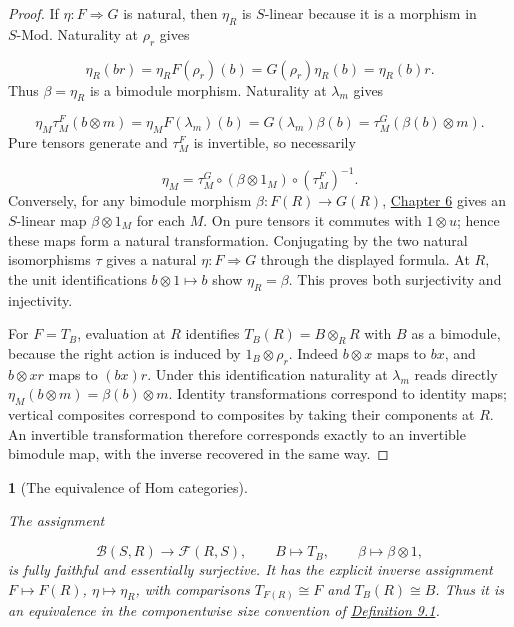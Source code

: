 \documentclass[11pt,a4paper]{article}
\newcommand{\mathheading}{}
\theoremstyle{plain}
\newtheorem*{plainstatement}{\mathheading}
\theoremstyle{definition}
\newenvironment{mathstatement}[3]{\renewcommand{\mathheading}{#1 #2}\begin{plainstatement}[#3]}{\end{plainstatement}}
\begin{document}
\begin{proof}

If \(\eta:F\Rightarrow G\) is natural, then \(\eta_R\) is \(S\)-linear because it is a morphism in \(S\text{-Mod}\). Naturality at \(\rho_r\) gives

 \[\eta_R(br)=\eta_RF(\rho_r)(b)=G(\rho_r)\eta_R(b)=\eta_R(b)r.\] 
Thus \(\beta=\eta_R\) is a bimodule morphism. Naturality at \(\lambda_m\) gives

 \[\eta_M\tau^F_M(b\otimes m)=\eta_MF(\lambda_m)(b)=G(\lambda_m)\beta(b)=\tau^G_M(\beta(b)\otimes m).\] 
Pure tensors generate and \(\tau^F_M\) is invertible, so necessarily

 \[\eta_M=\tau^G_M\circ(\beta\otimes1_M)\circ(\tau^F_M)^{-1}.\] 
Conversely, for any bimodule morphism \(\beta:F(R)\to G(R)\), \hyperref[chapter-06]{Chapter 6} gives an \(S\)-linear map \(\beta\otimes1_M\) for each \(M\). On pure tensors it commutes with \(1\otimes u\); hence these maps form a natural transformation. Conjugating by the two natural isomorphisms \(\tau\) gives a natural \(\eta:F\Rightarrow G\) through the displayed formula. At \(R\), the unit identifications \(b\otimes1\mapsto b\) show \(\eta_R=\beta\). This proves both surjectivity and injectivity.

 
For \(F=T_B\), evaluation at \(R\) identifies \(T_B(R)=B\otimes_RR\) with \(B\) as a bimodule, because the right action is induced by \(1_B\otimes\rho_r\). Indeed \(b\otimes x\) maps to \(bx\), and \(b\otimes xr\) maps to \((bx)r\). Under this identification naturality at \(\lambda_m\) reads directly \(\eta_M(b\otimes m)=\beta(b)\otimes m\). Identity transformations correspond to identity maps; vertical composites correspond to composites by taking their components at \(R\). An invertible transformation therefore corresponds exactly to an invertible bimodule map, with the inverse recovered in the same way.


\end{proof}
 
\begin{mathstatement}{Corollary}{9.6}{The equivalence of Hom categories}
\label{env-9-6}

The assignment

 \[\mathscr B(S,R)\longrightarrow\mathscr F(R,S),\qquad B\longmapsto T_B,\qquad \beta\longmapsto\beta\otimes1,\] 
is fully faithful and essentially surjective. It has the explicit inverse assignment \(F\mapsto F(R)\), \(\eta\mapsto\eta_R\), with comparisons \(T_{F(R)}\cong F\) and \(T_B(R)\cong B\). Thus it is an equivalence in the componentwise size convention of \hyperref[env-9-1]{Definition 9.1}.


\par{}\par

\end{mathstatement}
 
\end{document}
